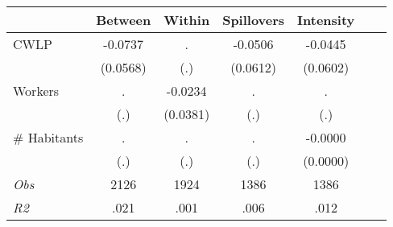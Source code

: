 \begin{tabular}{l*{6}{c}}\hline&\multicolumn{1}{c}{Between}&\multicolumn{1}{c}{Within}&\multicolumn{1}{c}{Spillovers}&\multicolumn{1}{c}{Intensity}\\ \hline 
CWLP & -0.0737 & . & -0.0506 & -0.0445 \\
 & (0.0568) & (.) & (0.0612) & (0.0602) \\
Workers & . & -0.0234 & . & . \\
 & (.) & (0.0381) & (.) & (.) \\
\# Habitants & . & . & . & -0.0000 \\
  & (.) & (.) & (.) & (0.0000) \\
\hline \textit{Obs} & 2126 & 1924 & 1386 & 1386  \\ \textit{R2} & .021 & .001 & .006 & .012 \\ \hline \end{tabular}

